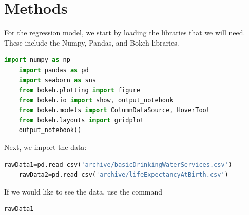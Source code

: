 \documentclass[12pt]{article}
\begin{document}
\section{Methods}

For the regression model, we start by loading the libraries that we will need. These include the Numpy, Pandas, and Bokeh libraries.

\begin{lstlisting}[language=Python]
    import numpy as np
    import pandas as pd
    import seaborn as sns
    from bokeh.plotting import figure
    from bokeh.io import show, output_notebook
    from bokeh.models import ColumnDataSource, HoverTool
    from bokeh.layouts import gridplot
    output_notebook()
\end{lstlisting}

Next, we import the data:
\begin{lstlisting}[language=Python]
    rawData1=pd.read_csv('archive/basicDrinkingWaterServices.csv')
    rawData2=pd.read_csv('archive/lifeExpectancyAtBirth.csv')
\end{lstlisting}

If we would like to see the data, use the command
\begin{lstlisting}[language=Python]
    rawData1
\end{lstlisting}
\end{document}
